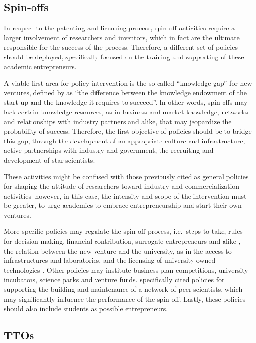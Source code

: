 \subsection{Spin-offs}

In respect to the patenting and licensing process, spin-off activities require a larger involvement of researchers and inventors, which in fact are the ultimate responsible for the success of the process. Therefore, a different set of policies should be deployed, specifically focused on the training and supporting of these academic entrepreneurs.

A viable first area for policy intervention is the so-called \enquote{knowledge gap} for new ventures, defined by \citet{Lockett2005a} as \enquote{the difference between the knowledge endowment of the start-up and the knowledge it requires to succeed}. In other words, spin-offs may lack certain knowledge resources, as in business and market knowledge, networks and relationships with industry partners and alike, that may jeopardize the probability of success. Therefore, the first objective of policies should be to bridge this gap, through the development of an appropriate culture and infrastructure, active partnerships with industry and government, the recruiting and development of star scientists. 

These activities might be confused with those previously cited as general policies for shaping the attitude of researchers toward industry and commercialization activities; however, in this case, the intensity and scope of the intervention must be greater, to urge academics to embrace entrepreneurship and start their own ventures.

More specific policies may regulate the spin-off process, i.e.\ steps to take, rules for decision making, financial contribution, surrogate entrepreneurs and alike \citep{Franklin2001}, the relation between the new venture and the university, as in the access to infrastructures and laboratories, and the licensing of university-owned technologies \citep{Fini2009}. Other policies may institute business plan competitions, university incubators, science parks and venture funds. \citet{Siegel2007} specifically cited policies for supporting the building and maintenance of a network of peer scientists, which may significantly influence the performance of the spin-off. Lastly, these policies should also include students as possible entrepreneurs. 

\subsection{TTOs}

